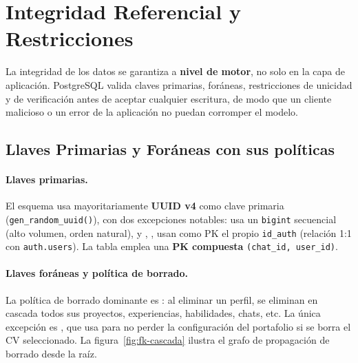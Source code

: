 \section{Integridad Referencial y Restricciones}
\label{sec:integridad}

La integridad de los datos se garantiza a \textbf{nivel de motor}, no solo en la capa de
aplicación. PostgreSQL valida claves primarias, foráneas, restricciones de unicidad y
de verificación antes de aceptar cualquier escritura, de modo que un cliente
malicioso o un error de la aplicación no puedan corromper el modelo.

\subsection{Llaves Primarias y Foráneas con sus políticas}
\label{subsec:pk_fk}

\paragraph{Llaves primarias.} El esquema usa mayoritariamente \textbf{UUID v4} como
clave primaria (\texttt{gen\_random\_uuid()}), con dos excepciones notables:
 usa un \texttt{bigint} secuencial (alto volumen, orden natural),
y , , 
usan como PK el propio \texttt{id\_auth} (relación 1:1 con \texttt{auth.users}). La tabla
 emplea una \textbf{PK compuesta} \texttt{(chat\_id, user\_id)}.

\paragraph{Llaves foráneas y política de borrado.} La política de borrado dominante es
: al eliminar un perfil, se eliminan en cascada todos sus
proyectos, experiencias, habilidades, chats, etc. La única excepción es
, que usa  para no perder la configuración del portafolio si se borra el CV seleccionado. La
figura~\ref{fig:fk-cascada} ilustra el grafo de propagación de borrado desde la raíz.

